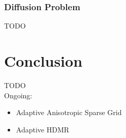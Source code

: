 \documentclass[11pt]{article}
\begin{document}
\subsubsection{Diffusion Problem}
TODO


\section{Conclusion}
TODO\\Ongoing:
\begin{itemize}
\item Adaptive Anisotropic Sparse Grid
\item Adaptive HDMR
\end{itemize}
%
\end{document}
